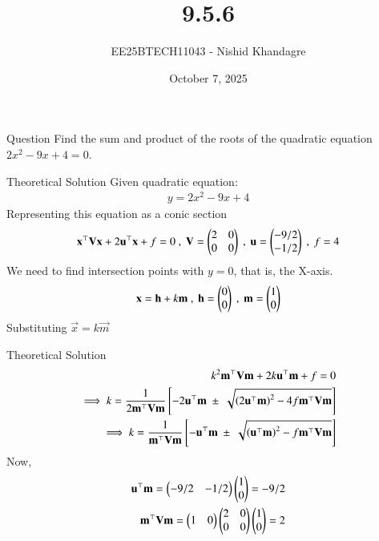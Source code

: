 \documentclass{beamer}
\title
{9.5.6}
\date{October 7, 2025}
\author
{EE25BTECH11043 - Nishid Khandagre}
\begin{document}
\frame{\titlepage}

\begin{frame}{Question}
Find the sum and product of the roots of the quadratic equation
$2x^2-9x + 4 = 0$.
\end{frame}

\begin{frame}{Theoretical Solution}
Given quadratic equation:
\begin{align}
    y=2x^2 - 9x + 4
\end{align}
Representing this equation as a conic section
\begin{align}
    \mathbf{x}^{\top}\mathbf{V}\mathbf{x} + 2\mathbf{u}^{\top}\mathbf{x} + f=0 \ , \  \mathbf{V}=\begin{pmatrix}2 & 0\\0&0\end{pmatrix} \ , \  \mathbf{u}=\begin{pmatrix}-9/2 \\ -1/2\end{pmatrix} \ ,\ f=4
\end{align}
We need to find intersection points with $y=0$, that is, the X-axis.
\begin{align}
    \vec{x}=\vec{h} + k \vec{m} \ , \ \vec{h}=\myvec{0 \\ 0} \ , \ \vec{m}=\myvec{1 \\ 0}
\end{align}
Substituting $\vec{x} = k \vec{m}$
\end{frame}

\begin{frame}{Theoretical Solution}
\begin{align}
    k^2\mathbf{m}^{\top}\mathbf{V}\mathbf{m} + 2k\mathbf{u}^{\top}\mathbf{m} + f=0 \\
    \implies k= \dfrac{1}{2 \mathbf{m}^{\top}\mathbf{V}\mathbf{m}} {}\left[ -2\mathbf{u}^{\top}\mathbf{m} \ \pm \ \sqrt{\left(2\mathbf{u}^{\top}\mathbf{m}\right)^2 - 4 f \mathbf{m}^{\top}\mathbf{V}\mathbf{m}}\right]\\
    \implies k= \dfrac{1}{\mathbf{m}^{\top}\mathbf{V}\mathbf{m}} {}\left[ -\mathbf{u}^{\top}\mathbf{m} \ \pm \ \sqrt{\left(\mathbf{u}^{\top}\mathbf{m}\right)^2-f \mathbf{m}^{\top}\mathbf{V}\mathbf{m}}\right]
\end{align}
Now,
\begin{align}
    \mathbf{u}^{\top}\mathbf{m} = \begin{pmatrix}-9/2 & -1/2\end{pmatrix}\begin{pmatrix}1 \\0\end{pmatrix} = -9/2 \\
    \mathbf{m}^{\top}\mathbf{V}\mathbf{m}=\begin{pmatrix}1 & 0\end{pmatrix}\begin{pmatrix}2 & 0\\0&0\end{pmatrix}\begin{pmatrix}1 \\ 0\end{pmatrix} = 2
\end{align}
\end{frame}
\end{document}

